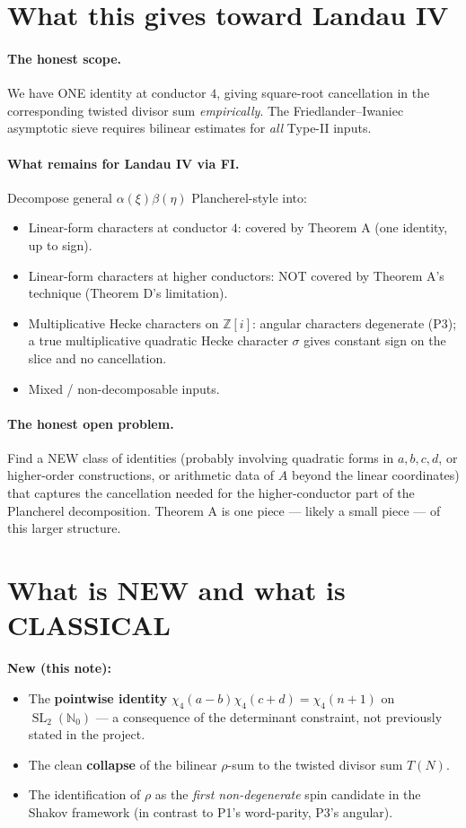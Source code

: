 \documentclass[11pt]{article}
\DeclareMathOperator{\SL}{SL}
\begin{document}
\section{What this gives toward Landau IV}

\paragraph{The honest scope.}
We have ONE identity at conductor $4$, giving square-root cancellation in the
corresponding twisted divisor sum \emph{empirically}. The
Friedlander--Iwaniec asymptotic sieve requires bilinear estimates for
\emph{all} Type-II inputs.

\paragraph{What remains for Landau IV via FI.}
Decompose general $\alpha(\xi)\beta(\eta)$ Plancherel-style into:
\begin{itemize}
\item Linear-form characters at conductor $4$: covered by Theorem A (one
identity, up to sign).
\item Linear-form characters at higher conductors: NOT covered by Theorem A's
technique (Theorem D's limitation).
\item Multiplicative Hecke characters on $\mathbb{Z}[i]$: angular characters
degenerate (P3); a true multiplicative quadratic Hecke character $\sigma$ gives
constant sign on the slice and no cancellation.
\item Mixed / non-decomposable inputs.
\end{itemize}

\paragraph{The honest open problem.}
Find a NEW class of identities (probably involving quadratic forms in $a, b,
c, d$, or higher-order constructions, or arithmetic data of $A$ beyond the
linear coordinates) that captures the cancellation needed for the
higher-conductor part of the Plancherel decomposition. Theorem A is one piece
--- likely a small piece --- of this larger structure.

\section{What is NEW and what is CLASSICAL}

\textbf{New (this note):}
\begin{itemize}
\item The \textbf{pointwise identity} $\chi_4(a-b)\chi_4(c+d) = \chi_4(n+1)$ on
$\SL_2(\mathbb{N}_0)$ --- a consequence of the determinant constraint, not
previously stated in the project.
\item The clean \textbf{collapse} of the bilinear $\rho$-sum to the twisted
divisor sum $T(N)$.
\item The identification of $\rho$ as the \emph{first non-degenerate} spin
candidate in the Shakov framework (in contrast to P1's word-parity, P3's
angular).
\end{itemize}
\end{document}

